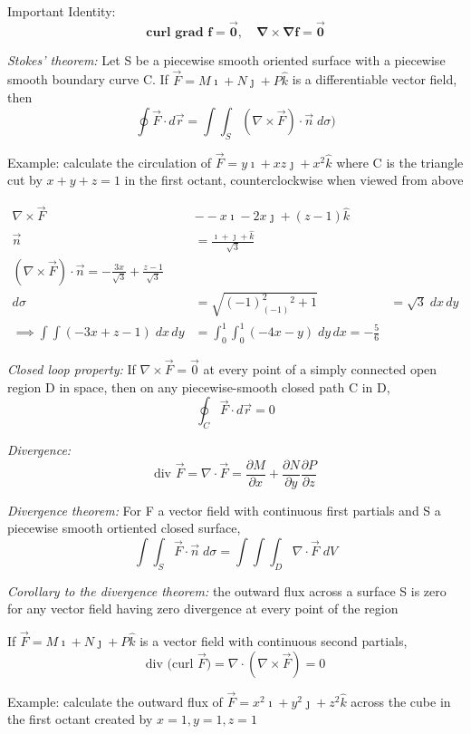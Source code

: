 \documentclass[12pt]{article}
\begin{document}
Important Identity:
\[\mathbf{\text{curl grad } f = \vec{0}, \quad \nabla \times \nabla f = \vec{0}}\]

\emph{Stokes' theorem:} Let S be a piecewise smooth oriented surface with a piecewise smooth boundary curve C. If $\vec{F} = M \imath + N \jmath + P \hat{k}$ is a differentiable vector field, then 
\[\oint \vec{F} \cdot d\vec{r} = \int \int_S (\nabla \times \vec{F}) \cdot \vec{n} \; d\sigma)\]

Example: calculate the circulation of $\vec{F} = y\imath + xz\jmath + x^2 \hat{k}$ where C is the triangle cut by $x+y+z=1$ in the first octant, counterclockwise when viewed from above

\begin{align*}
    \nabla \times \vec{F} &- -x\imath -2x\jmath + (z-1) \hat{k}\\
    \vec{n} &= \frac{\imath + \jmath + \hat{k}}{\sqrt{3}}\\ 
    (\nabla \times \vec{F}) \cdot \vec{n} = -\frac{3x}{\sqrt{3}} + \frac{z - 1}{\sqrt{3}}\\
    d\sigma &= \sqrt{(-1)^2 _ (-1)^2 + 1} &= \sqrt{3} \; dx\, dy\\
    \implies \int \int(-3x + z - 1)\; dx\, dy &= \int_0^1 \int_0^1 (-4x-y) \; dy\, dx =  -\frac{5}{6}
\end{align*}

\emph{Closed loop property:} If $\nabla \times \vec{F} = \vec{0}$ at every point of a simply connected open region D in space, then on any piecewise-smooth closed path C in D, 
\[\oint_C \vec{F} \cdot d\vec{r} = 0\]

\emph{Divergence:} 
\[\text{div } \vec{F} = \nabla \cdot \vec{F} = \frac{\partial M}{\partial x} + \frac{\partial N}{\partial y} \frac{\partial P}{\partial z}\]

\emph{Divergence theorem:} For F a vector field with continuous first partials and S a piecewise smooth ortiented closed surface,
\[\int \int_S \vec{F} \cdot \vec{n} \; d\sigma = \int \int \int_D \nabla \cdot \vec{F} \; dV\]

\emph{Corollary to the divergence theorem:} the outward flux across a surface S is zero for any vector field having zero divergence at every point of the region 

If $\vec{F} = M\imath + N \jmath + P \hat{k}$ is a vector field with continuous second partials, 
\[\text{div (curl } \vec{F}) = \nabla \cdot (\nabla \times \vec{F}) = 0\]

Example: calculate the outward flux of $\vec{F} = x^2 \imath + y^2 \jmath + z^2 \hat{k}$ across the cube in the first octant created by $x=1, y=1, z=1$
\end{document}
